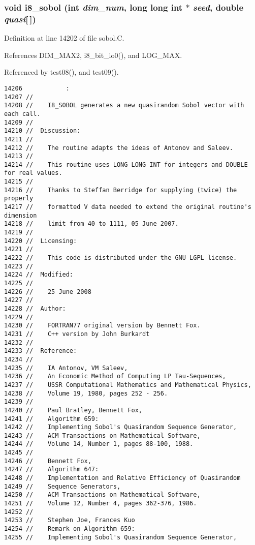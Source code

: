 \subsubsection{\setlength{\rightskip}{0pt plus 5cm}void i8\_\-sobol (int {\em dim\_\-num}, long long int $\ast$ {\em seed}, double {\em quasi}[$\,$])}\label{sobol_8C_687d6bd2ce71be51a560e949d4ec371a}




Definition at line 14202 of file sobol.C.

References DIM\_\-MAX2, i8\_\-bit\_\-lo0(), and LOG\_\-MAX.

Referenced by test08(), and test09().

\begin{Code}\begin{verbatim}14206            :
14207 //
14208 //    I8_SOBOL generates a new quasirandom Sobol vector with each call.
14209 //
14210 //  Discussion:
14211 //
14212 //    The routine adapts the ideas of Antonov and Saleev.
14213 //
14214 //    This routine uses LONG LONG INT for integers and DOUBLE for real values.
14215 //
14216 //    Thanks to Steffan Berridge for supplying (twice) the properly
14217 //    formatted V data needed to extend the original routine's dimension
14218 //    limit from 40 to 1111, 05 June 2007.
14219 //
14220 //  Licensing:
14221 //
14222 //    This code is distributed under the GNU LGPL license. 
14223 //
14224 //  Modified:
14225 //
14226 //    25 June 2008
14227 //
14228 //  Author:
14229 //
14230 //    FORTRAN77 original version by Bennett Fox.
14231 //    C++ version by John Burkardt
14232 //
14233 //  Reference:
14234 //
14235 //    IA Antonov, VM Saleev,
14236 //    An Economic Method of Computing LP Tau-Sequences,
14237 //    USSR Computational Mathematics and Mathematical Physics,
14238 //    Volume 19, 1980, pages 252 - 256.
14239 //
14240 //    Paul Bratley, Bennett Fox,
14241 //    Algorithm 659:
14242 //    Implementing Sobol's Quasirandom Sequence Generator,
14243 //    ACM Transactions on Mathematical Software,
14244 //    Volume 14, Number 1, pages 88-100, 1988.
14245 //
14246 //    Bennett Fox,
14247 //    Algorithm 647:
14248 //    Implementation and Relative Efficiency of Quasirandom 
14249 //    Sequence Generators,
14250 //    ACM Transactions on Mathematical Software,
14251 //    Volume 12, Number 4, pages 362-376, 1986.
14252 //
14253 //    Stephen Joe, Frances Kuo
14254 //    Remark on Algorithm 659:
14255 //    Implementing Sobol's Quasirandom Sequence Generator,

\end{verbatim}
\end{Code}
